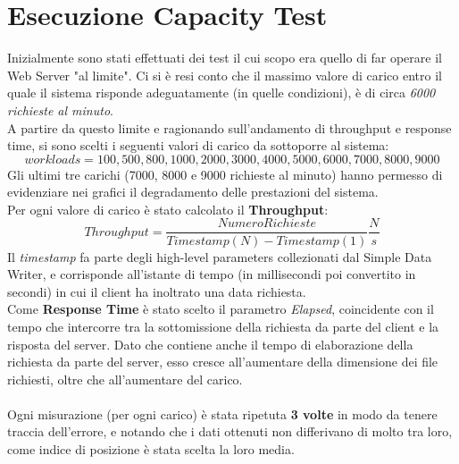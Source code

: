\section{Esecuzione Capacity Test}
Inizialmente sono stati effettuati dei test il cui scopo era quello di far operare il Web Server "al limite". Ci si è resi conto che il massimo valore di carico entro il quale il sistema risponde adeguatamente (in quelle condizioni), è di circa \textit{6000 richieste al minuto}. 
\\
A partire da questo limite e ragionando sull'andamento di throughput e response time, si sono scelti i seguenti valori di carico da sottoporre al sistema:
\begin{equation}
	workloads = {100, 500, 800, 1000, 2000, 3000, 4000, 5000, 6000, 7000, 8000, 9000}
\end{equation}
Gli ultimi tre carichi (7000, 8000 e 9000 richieste al minuto) hanno permesso di evidenziare nei grafici il degradamento delle prestazioni del sistema.
\\
Per ogni valore di carico è stato calcolato il \textbf{Throughput}:
\begin{equation}
	Throughput = \frac{NumeroRichieste}{Timestamp(N) - Timestamp(1)} \frac{N}{s}
\end{equation}
Il \textit{timestamp} fa parte degli high-level parameters collezionati dal Simple Data Writer, e corrisponde all'istante di tempo (in millisecondi poi convertito in secondi) in cui il client ha inoltrato una data richiesta.
\\
Come \textbf{Response Time} è stato scelto il parametro \textit{Elapsed}, coincidente con il tempo che intercorre tra la sottomissione della richiesta da parte del client e la risposta del server. Dato che contiene anche il tempo di elaborazione della richiesta da parte del server, esso cresce all'aumentare della dimensione dei file richiesti, oltre che all'aumentare del carico.
\\
\\
Ogni misurazione (per ogni carico) è stata ripetuta \textbf{3 volte} in modo da tenere traccia dell'errore, e notando che i dati ottenuti non differivano di molto tra loro, come indice di posizione è stata scelta la loro media.
\\
